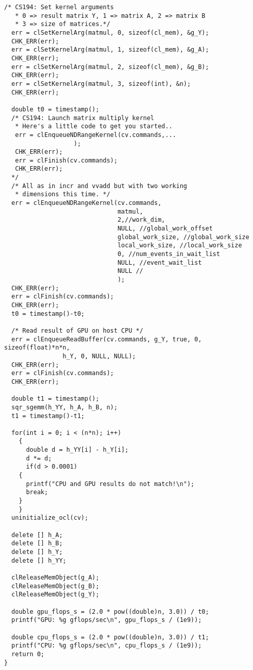 \documentclass[11pt,letter]{article}
\begin{document}
\begin{lstlisting}[label=some-code,caption=matmul.cpp]
  /* CS194: Set kernel arguments 
   * 0 => result matrix Y, 1 => matrix A, 2 => matrix B
   * 3 => size of matrices.*/
  err = clSetKernelArg(matmul, 0, sizeof(cl_mem), &g_Y);
  CHK_ERR(err);
  err = clSetKernelArg(matmul, 1, sizeof(cl_mem), &g_A);
  CHK_ERR(err);
  err = clSetKernelArg(matmul, 2, sizeof(cl_mem), &g_B);
  CHK_ERR(err);
  err = clSetKernelArg(matmul, 3, sizeof(int), &n);
  CHK_ERR(err);

  double t0 = timestamp();
  /* CS194: Launch matrix multiply kernel
   * Here's a little code to get you started.. 
   err = clEnqueueNDRangeKernel(cv.commands,...
			       );
   CHK_ERR(err);
   err = clFinish(cv.commands);
   CHK_ERR(err);
  */
  /* All as in incr and vvadd but with two working 
   * dimensions this time. */
  err = clEnqueueNDRangeKernel(cv.commands,
                               matmul,
                               2,//work_dim,
                               NULL, //global_work_offset
                               global_work_size, //global_work_size
                               local_work_size, //local_work_size
                               0, //num_events_in_wait_list
                               NULL, //event_wait_list
                               NULL //
                               );
  CHK_ERR(err);
  err = clFinish(cv.commands);
  CHK_ERR(err);
  t0 = timestamp()-t0;

  /* Read result of GPU on host CPU */
  err = clEnqueueReadBuffer(cv.commands, g_Y, true, 0, sizeof(float)*n*n,
			    h_Y, 0, NULL, NULL);
  CHK_ERR(err);
  err = clFinish(cv.commands);
  CHK_ERR(err);

  double t1 = timestamp();
  sqr_sgemm(h_YY, h_A, h_B, n);
  t1 = timestamp()-t1;

  for(int i = 0; i < (n*n); i++)
    {
      double d = h_YY[i] - h_Y[i];
      d *= d;
      if(d > 0.0001)
	{
	  printf("CPU and GPU results do not match!\n");
	  break;
	}
    }
  uninitialize_ocl(cv);
  
  delete [] h_A; 
  delete [] h_B; 
  delete [] h_Y;
  delete [] h_YY;

  clReleaseMemObject(g_A); 
  clReleaseMemObject(g_B); 
  clReleaseMemObject(g_Y);
  
  double gpu_flops_s = (2.0 * pow((double)n, 3.0)) / t0;
  printf("GPU: %g gflops/sec\n", gpu_flops_s / (1e9));

  double cpu_flops_s = (2.0 * pow((double)n, 3.0)) / t1;
  printf("CPU: %g gflops/sec\n", cpu_flops_s / (1e9));
  return 0;
}
\end{lstlisting}

\end{document}
